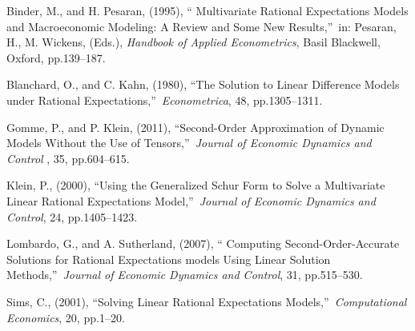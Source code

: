 \documentclass[thmsa,notitlepage,11pt]{article}
\begin{document}
\begin{thebibliography}{9}
\bibitem{} Binder, M., and H. Pesaran, (1995), \textquotedblleft
Multivariate Rational Expectations Models and Macroeconomic Modeling: A
Review and Some New Results,\textquotedblright\ in: Pesaran, H., M. Wickens,
(Eds.), \textit{Handbook of Applied Econometrics}, Basil Blackwell, Oxford,
pp.139--187.

\bibitem{} Blanchard, O., and C. Kahn, (1980), \textquotedblleft The
Solution to Linear Difference Models under Rational
Expectations,\textquotedblright\ \textit{Econometrica}, 48, pp.1305--1311.

\bibitem{} Gomme, P., and P. Klein, (2011), \textquotedblleft Second-Order
Approximation of Dynamic Models Without the Use of
Tensors,\textquotedblright\ \textit{Journal of Economic Dynamics and Control}%
, 35, pp.604--615.

\bibitem{} Klein, P., (2000), \textquotedblleft Using the Generalized Schur
Form to Solve a Multivariate Linear Rational Expectations
Model,\textquotedblright\ \textit{Journal of Economic Dynamics and Control},
24, pp.1405--1423.

\bibitem{} Lombardo, G., and A. Sutherland, (2007), \textquotedblleft
Computing Second-Order-Accurate Solutions for Rational Expectations models
Using Linear Solution Methods,\textquotedblright\ \textit{Journal of
Economic Dynamics and Control}, 31, pp.515--530.

\bibitem{} Sims, C., (2001), \textquotedblleft Solving Linear Rational
Expectations Models,\textquotedblright\ \textit{Computational Economics},
20, pp.1--20.
\end{thebibliography}
\end{document}

